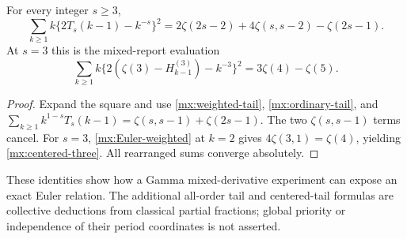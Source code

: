 \begin{corollary}\label{mx:centered-tails}
For every integer $s\ge3$,
\begin{equation}\label{mx:centered-tail-family}
 \sum_{k\ge1}k\{2T_s(k-1)-k^{-s}\}^2
 =2\zeta(2s-2)+4\zeta(s,s-2)-\zeta(2s-1).
\end{equation}
At $s=3$ this is the mixed-report evaluation
\begin{equation}\label{mx:centered-three}
 \boxed{\sum_{k\ge1}k
       \{2(\zeta(3)-H_{k-1}^{(3)})-k^{-3}\}^2
                   =3\zeta(4)-\zeta(5).}
\end{equation}
\end{corollary}
\begin{proof}
Expand the square and use \eqref{mx:weighted-tail},
\eqref{mx:ordinary-tail}, and
$\sum_{k\ge1}k^{1-s}T_s(k-1)=\zeta(s,s-1)+\zeta(2s-1)$.
The two $\zeta(s,s-1)$ terms cancel. For $s=3$,
\eqref{mx:Euler-weighted} at $k=2$ gives
$4\zeta(3,1)=\zeta(4)$, yielding \eqref{mx:centered-three}.
All rearranged sums converge absolutely.
\end{proof}
These identities show how a Gamma mixed-derivative experiment can expose
an exact Euler relation. The additional all-order tail and centered-tail
formulas are collective deductions from classical partial fractions;
global priority or independence of their period coordinates is not asserted.
